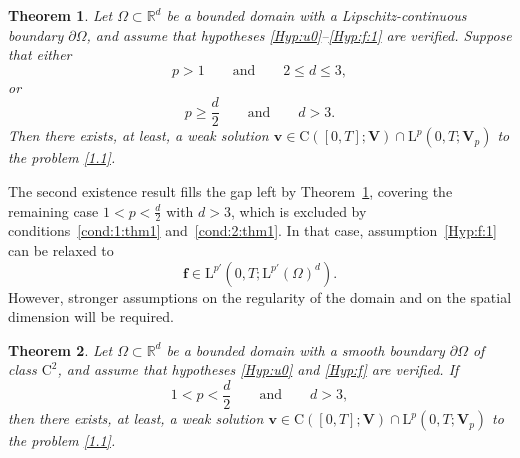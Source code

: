 \documentclass[12pt,reqno]{amsart}
\numberwithin{equation}{section}
\newtheorem{theorem}{Theorem}[section]
\theoremstyle{definition}
\def\1{\Omega}
\def\R{\mathbb{R}}
\def\L{\mathrm{L}}
\def\vv{\boldsymbol{v}}
\def\f{\boldsymbol{f}}
\def\C{\mathrm{C}}
\def\bfV{\mathbf{V}}
\begin{document}
\begin{theorem}\label{thm:exist:1}
Let $\1\subset\R^d$ be a bounded domain with a \emph{Lipschitz-continuous boundary $\partial\1$}, and assume that hypotheses \eqref{Hyp:u0}--\eqref{Hyp:f:1} are verified.
Suppose that either
\begin{equation}\label{cond:1:thm1}
p>1\qquad \mbox{and}\qquad 2\leq d\leq 3,
\end{equation}
or
{
\begin{equation}\label{cond:2:thm1}
p\geq \frac{d}{2}\qquad \mbox{and}\qquad d>3.
\end{equation}
}
Then there exists, at least, a weak solution $\vv \in \C([0,T];\bfV)\cap \L^p(0,T;\bfV_p)$ to the problem \eqref{1.1}.
	\end{theorem}
{The second existence result fills the gap left by Theorem~\ref{thm:exist:1}, covering the remaining case $1<p<\tfrac{d}{2}$ with $d>3$, which is excluded by conditions~\eqref{cond:1:thm1} and~\eqref{cond:2:thm1}.
In that case, assumption~\eqref{Hyp:f:1} can be relaxed to}
\begin{equation}\label{Hyp:f}
  \f\in\L^{p'}(0,T;\L^{p'}(\1)^d).
\end{equation}
However, stronger assumptions on the regularity of the domain and on the spatial dimension will be required.

\begin{theorem}\label{thm:exist:2}
Let $\1\subset\R^d$ be a bounded domain with a \emph{smooth boundary $\partial\1$ of class $\C^2$}, and assume that hypotheses \eqref{Hyp:u0} and \eqref{Hyp:f} are verified.
If
{\begin{equation}\label{3.7}
1<p<\frac{d}{2}\qquad \mbox{and}\qquad d>3,
\end{equation}
}then there exists, at least, a weak solution $\vv \in \C([0,T];\bfV)\cap \L^p(0,T;\bfV_p)$ to the problem \eqref{1.1}.
	\end{theorem}
\end{document}
